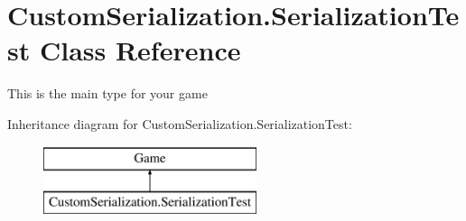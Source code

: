\hypertarget{class_custom_serialization_1_1_serialization_test}{\section{Custom\-Serialization.\-Serialization\-Test Class Reference}
\label{class_custom_serialization_1_1_serialization_test}
}


This is the main type for your game  


Inheritance diagram for Custom\-Serialization.\-Serialization\-Test\-:\begin{figure}[H]
\begin{center}
\leavevmode
\includegraphics[height=2.000000cm]{class_custom_serialization_1_1_serialization_test}
\end{center}
\end{figure}
